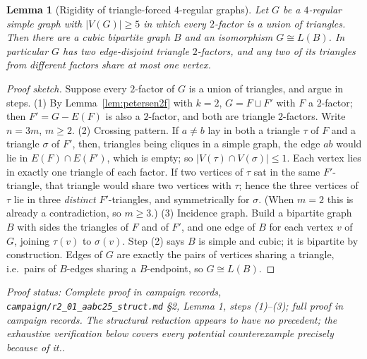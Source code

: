 \documentclass[a4paper,11pt]{amsart}
\newtheorem{lemma}[theorem]{Lemma}
\theoremstyle{definition}
\theoremstyle{remark}
\newcommand{\proofsrc}[1]{\par\smallskip\noindent\begin{sloppypar}\small\emph{Proof status: #1.}\end{sloppypar}\par\smallskip}
\begin{document}
\begin{lemma}[Rigidity of triangle-forced $4$-regular graphs]\label{lem:fourreg}
Let $G$ be a $4$-regular simple graph with $|V(G)|\ge5$ in which every $2$-factor is a union of triangles.
Then there are a cubic bipartite graph $B$ and an isomorphism $G\cong L(B)$. In particular $G$ has two
edge-disjoint triangle $2$-factors, and any two of its triangles from different factors share at most one
vertex.
\end{lemma}
\begin{proof}[Proof sketch]
Suppose every $2$-factor of $G$ is a union of triangles, and argue in steps.
(1) By Lemma~\ref{lem:petersen2f} with $k=2$, $G=F\sqcup F'$ with $F$ a $2$-factor; then $F'=G-E(F)$ is
also a $2$-factor, and both are triangle $2$-factors. Write $n=3m$, $m\ge2$.
(2) Crossing pattern. If $a\ne b$ lay in both a triangle $\tau$ of $F$ and a triangle $\sigma$ of $F'$,
then, triangles being cliques in a simple graph, the edge $ab$ would lie in $E(F)\cap E(F')$, which is
empty; so $|V(\tau)\cap V(\sigma)|\le1$. Each vertex lies in exactly one triangle of each factor. If two
vertices of $\tau$ sat in the same $F'$-triangle, that triangle would share two vertices with $\tau$;
hence the three vertices of $\tau$ lie in three \emph{distinct} $F'$-triangles, and symmetrically for
$\sigma$. (When $m=2$ this is already a contradiction, so $m\ge3$.)
(3) Incidence graph. Build a bipartite graph $B$ with sides the triangles of $F$ and of $F'$, and one edge
of $B$ for each vertex $v$ of $G$, joining $\tau(v)$ to $\sigma(v)$. Step (2) says $B$ is simple and
cubic; it is bipartite by construction. Edges of $G$ are exactly the pairs of vertices sharing a triangle,
i.e.\ pairs of $B$-edges sharing a $B$-endpoint, so $G\cong L(B)$.
\end{proof}
\proofsrc{Complete proof in campaign records, \texttt{campaign/r2\_01\_aabc25\_struct.md} \S2, Lemma 1,
steps (1)--(3); full proof in campaign records. The structural reduction appears to have no precedent; the
exhaustive verification below covers every potential counterexample precisely because of it.}
\end{document}
